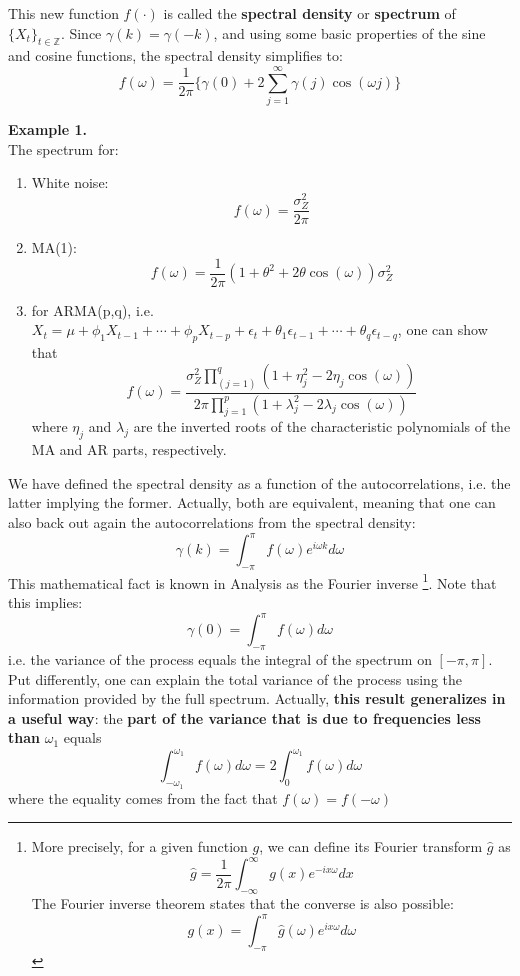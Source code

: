 This new function $f(\cdot)$ is called the \textbf{spectral density} or \textbf{spectrum} of $\{X_t\}_{t\in \mathbb{Z}}$. Since $\gamma(k)=\gamma(-k)$, and using some basic properties of the sine and cosine functions, the spectral density simplifies to: \[
f(\omega)=\frac{1}{2\pi}\{\gamma(0) + 2\sum_{j=1}^\infty \gamma(j) \cos(\omega j)\}
\]

\textbf{Example 1.}\\

The spectrum for:
\begin{enumerate}
    \item White noise: \[
    f(\omega) = \frac{\sigma_Z^2}{2\pi}
    \]
    \item MA(1): \[
    f(\omega)=\frac{1}{2\pi}(1+\theta^2+2\theta\cos(\omega))\sigma_Z^2
    \]
    \item for ARMA(p,q), i.e. $X_t=\mu+\phi_1 X_{t-1}+\cdots+\phi_p X_{t-p} + \epsilon_t + \theta_1 \epsilon_{t-1} + \cdots +\theta_q \epsilon_{t-q} $, one can show that \[
    f(\omega)=\frac{\sigma_Z^2 \prod_(j=1)^q(1+\eta_j^2-2\eta_j \cos(\omega)) }{2\pi \prod_{j=1}^p(1+\lambda_j^2-2\lambda_j\cos(\omega)) }
    \] where $\eta_j$ and $\lambda_j$ are the inverted roots of the characteristic polynomials of the MA and AR parts, respectively.
\end{enumerate}

We have defined the spectral density as a function of the autocorrelations, i.e. the latter implying the former. Actually, both are equivalent, meaning that one can also back out again the autocorrelations from the spectral density: \[
\gamma(k)=\int_{-\pi}^\pi f(\omega) e^{i\omega k} d\omega
\]
This mathematical fact is known in Analysis as the Fourier inverse \footnote{More precisely, for a given function $g$, we can define its Fourier transform $\hat{g}$ as \[
\hat{g}=\frac{1}{2\pi} \int_{-\infty}^\infty g(x)e^{-ix\omega} dx
\] The Fourier inverse theorem states that the converse is also possible: \[
g(x) = \int_{-\pi}^\pi \hat{g}(\omega)e^{ix\omega}d\omega
\]
}. Note that this implies:\[
\gamma(0) = \int_{-\pi}^\pi f(\omega) d\omega
\]
i.e. the variance of the process equals the integral of the spectrum on $[-\pi,\pi]$. Put differently, one can explain the total variance of the process using the information provided by the full spectrum. Actually, \textbf{this result generalizes in a useful way}: the \textbf{part of the variance that is due to frequencies less than} $\omega_1$ equals \[
\int_{-\omega_1}^{\omega_1}f(\omega)d\omega=2\int_0^{\omega_1} f(\omega)d\omega \label{SP2}
\] where the equality comes from the fact that $f(\omega)=f(-\omega)$

